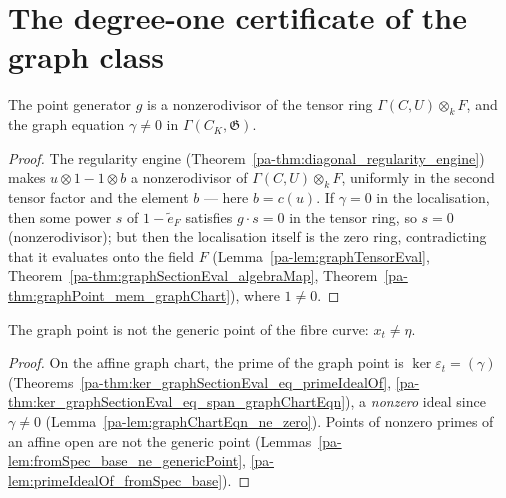 \section{The degree-one certificate of the graph class}
\label{pa-sec:graphDegree}

\begin{lemma}
  \label{pa-lem:graphChartEqn_ne_zero}
  \leanok

  The point generator \(g\) is a nonzerodivisor of the tensor ring
  \(\Gamma(C,U) \otimes_k F\), and the graph equation \(\gamma \neq 0\) in
  \(\Gamma(C_K, \mathfrak G)\).
\end{lemma}
\begin{proof}
  \leanok
  The regularity engine (Theorem~\ref{pa-thm:diagonal_regularity_engine}) makes
  \(u \otimes 1 - 1 \otimes b\) a nonzerodivisor of \(\Gamma(C,U) \otimes_k F\), uniformly
  in the second tensor factor and the element \(b\) — here \(b = c(u)\). If \(\gamma = 0\)
  in the localisation, then some power \(s\) of \(1 - \tilde e_F\) satisfies \(g \cdot s = 0\)
  in the tensor ring, so \(s = 0\) (nonzerodivisor); but then the localisation itself is
  the zero ring, contradicting that it evaluates onto the field \(F\)
  (Lemma~\ref{pa-lem:graphTensorEval}, Theorem~\ref{pa-thm:graphSectionEval_algebraMap},
  Theorem~\ref{pa-thm:graphPoint_mem_graphChart}), where \(1 \neq 0\).
\end{proof}

\begin{theorem}
  \label{pa-thm:graphPoint_ne_genericPoint}
  \leanok

  The graph point is not the generic point of the fibre curve:
  \(x_t \neq \eta\).
\end{theorem}
\begin{proof}
  \leanok
  On the affine graph chart, the prime of the graph point is
  \(\ker\varepsilon_t = (\gamma)\)
  (Theorems~\ref{pa-thm:ker_graphSectionEval_eq_primeIdealOf},
  \ref{pa-thm:ker_graphSectionEval_eq_span_graphChartEqn}), a \emph{nonzero} ideal since
  \(\gamma \neq 0\) (Lemma~\ref{pa-lem:graphChartEqn_ne_zero}). Points of nonzero primes of an
  affine open are not the generic point
  (Lemmas~\ref{pa-lem:fromSpec_base_ne_genericPoint},
  \ref{pa-lem:primeIdealOf_fromSpec_base}).
\end{proof}


